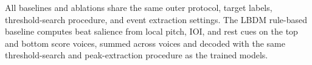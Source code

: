 \documentclass{article}
\begin{document}
All baselines and ablations share the same outer protocol, target labels, threshold-search procedure, and event extraction settings. The LBDM rule-based baseline computes beat salience from local pitch, IOI, and rest cues on the top and bottom score voices, summed across voices and decoded with the same threshold-search and peak-extraction procedure as the trained models.

\begin{table}[t]
  \centering
  \caption{Clean outer results for the weighted top-down cumulative hierarchy. Values are means over five random seeds, pooled across outer pieces M06-1, M06-2, and M06-3. }
  \label{tab:outer_merge56_results}
\end{table}
\end{document}
